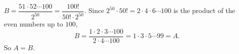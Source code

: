 $B=\dfrac{51\cdot52\cdots100}{2^{50}}=\dfrac{100!}{50!\cdot2^{50}}$. Since $2^{50}\cdot50!=2\cdot4\cdot6\cdots100$ is the product of the even numbers up to $100$,
\[
B=\dfrac{1\cdot2\cdot3\cdots100}{2\cdot4\cdots100}=1\cdot3\cdot5\cdots99=A .
\]
So $\boxed{A=B}$.
